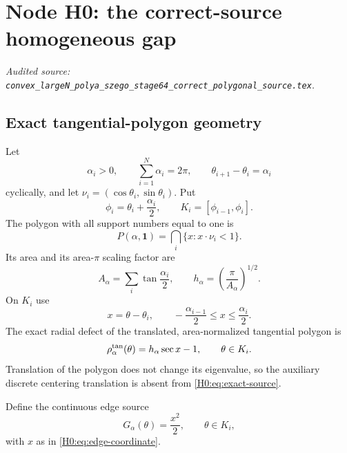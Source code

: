 \begingroup
\section{Node H0: the correct-source homogeneous gap}
\label{module:H0}
\noindent\textit{Audited source: \nolinkurl{convex_largeN_polya_szego_stage64_correct_polygonal_source.tex}.}
\subsection{Exact tangential-polygon geometry}

Let
\begin{equation}\label{H0:eq:fan}
 \alpha_i>0,\qquad \sum_{i=1}^N\alpha_i=2\pi,
 \qquad \theta_{i+1}-\theta_i=\alpha_i
\end{equation}
cyclically, and let
$\nu_i=(\cos\theta_i,\sin\theta_i)$.  Put
\begin{equation}\label{H0:eq:vertices}
 \phi_i=\theta_i+\frac{\alpha_i}{2},
 \qquad K_i=[\phi_{i-1},\phi_i].
\end{equation}
The polygon with all support numbers equal to one is
\begin{equation}
 P(\alpha,\mathbf 1)=\bigcap_i\{x:x\cdot\nu_i<1\}.
\end{equation}
Its area and its area-$\pi$ scaling factor are
\begin{equation}\label{H0:eq:scale}
 A_\alpha=\sum_i\tan\frac{\alpha_i}{2},
 \qquad h_\alpha=\left(\frac{\pi}{A_\alpha}\right)^{1/2}.
\end{equation}
On $K_i$ use
\begin{equation}\label{H0:eq:edge-coordinate}
 x=\theta-\theta_i,
 \qquad -\frac{\alpha_{i-1}}2\le x\le\frac{\alpha_i}2.
\end{equation}
The exact radial defect of the translated, area-normalized tangential
polygon is
\begin{equation}\label{H0:eq:exact-source}
 \rho_\alpha^{\rm tan}(\theta)=h_\alpha\sec x-1,
 \qquad \theta\in K_i.
\end{equation}
Translation of the polygon does not change its eigenvalue, so the auxiliary
discrete centering translation is absent from \eqref{H0:eq:exact-source}.

\begin{definition}\label{H0:def:G}
Define the continuous edge source
\begin{equation}\label{H0:eq:G}
 G_\alpha(\theta)=\frac{x^2}{2},
 \qquad \theta\in K_i,
\end{equation}
with $x$ as in \eqref{H0:eq:edge-coordinate}.
\end{definition}

